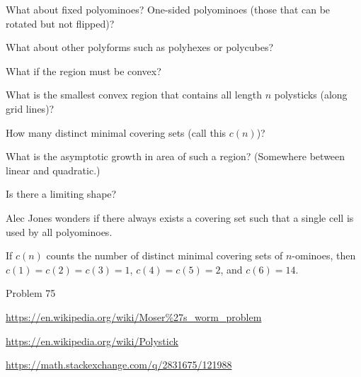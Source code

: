 \documentclass{article}
\begin{document}
\begin{related}
  \item What about fixed polyominoes? One-sided polyominoes (those that can be rotated but not flipped)?
  \item What about other polyforms such as polyhexes or polycubes?
  \item What if the region must be convex?
  \item What is the smallest convex region that contains all length $n$ polysticks (along grid lines)?
  \item How many distinct minimal covering sets (call this $c(n)$)?
  \item What is the asymptotic growth in area of such a region? (Somewhere between linear and quadratic.)
  \item Is there a limiting shape?
  \item Alec Jones wonders if there always exists a covering set such that a single
    cell is used by all polyominoes.
\end{related}

\begin{note}
  If $c(n)$ counts the number of distinct minimal covering sets of $n$-ominoes,
  then $c(1) = c(2) = c(3) = 1$, $c(4) = c(5) = 2$, and $c(6) = 14$.
\end{note}

\begin{references}
  \item Problem 75
  \item \url{https://en.wikipedia.org/wiki/Moser%27s_worm_problem}
  \item \url{https://en.wikipedia.org/wiki/Polystick}
  \item \url{https://math.stackexchange.com/q/2831675/121988}
\end{references}
\end{document}
